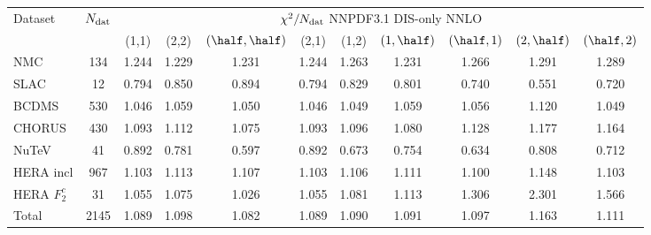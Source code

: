 \begin{center}
\renewcommand*{\arraystretch}{1.7}
\footnotesize
\begin{tabular}{|l|c|ccccccccc|}
  \toprule
Dataset  &  $N_{\rm dat}$ & \multicolumn{9}{c|}{$\chi^2/N_{\rm dat}$ NNPDF3.1 DIS-only NNLO}  \\
  &  & (1,1) & (2,2)  &  $(\half,\half)$  &  (2,1) & (1,2) &  $(1,\half)$ & $(\half,1)$ & $(2,\half)$ & $(\half,2)$  \\
\toprule
NMC  &  134           & 1.244     & 1.229   &  1.231 &  1.244  &   1.263  & 1.231  & 1.266  & 1.291  & 1.289      \\
SLAC  &  12           & 0.794    & 0.850   &  0.894  & 0.794   &  0.829  & 0.801  & 0.740  & 0.551  & 0.720       \\
BCDMS  &  530         & 1.046     & 1.059   &  1.050  & 1.046   &  1.049  & 1.059  & 1.056  & 1.120  & 1.049       \\
CHORUS  &  430        & 1.093     & 1.112   &  1.075  & 1.093   &  1.096  & 1.080  & 1.128  & 1.177  & 1.164       \\
NuTeV  &   41         & 0.892    & 0.781   &  0.597  & 0.892   &  0.673  & 0.754  & 0.634  & 0.808  & 0.712       \\
HERA incl  &  967     & 1.103     & 1.113   &  1.107  & 1.103   &  1.106  & 1.111  & 1.100  & 1.148  & 1.103       \\
HERA $F_2^c$  &  31   &  1.055    & 1.075   &  1.026  & 1.055   &  1.081  & 1.113  & 1.306  & 2.301  & 1.566        \\  
\midrule
Total  &  2145       & 1.089      & 1.098   &  1.082  & 1.089   &  1.090  & 1.091  & 1.097  & 1.163 & 1.111     \\
\bottomrule
\end{tabular}
\end{center}
